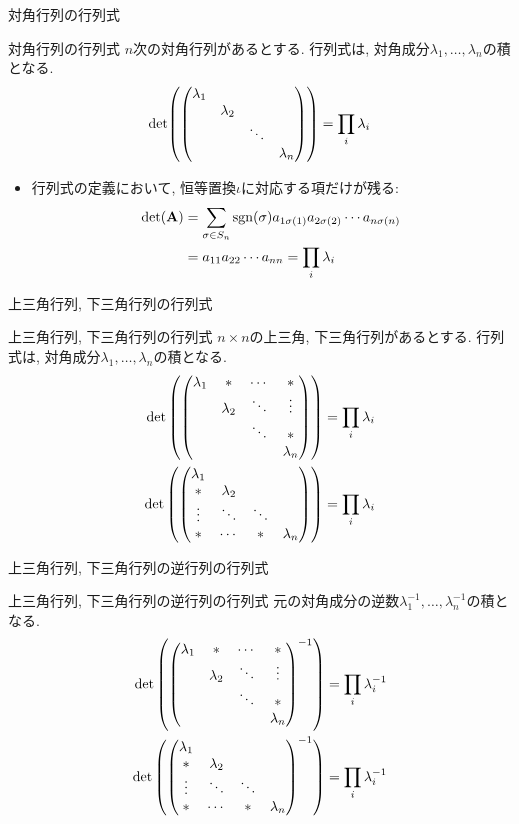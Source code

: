 \documentclass[dvipdfmx,notheorems,t]{beamer}
\begin{document}
\begin{frame}{対角行列の行列式}
\begin{block}{対角行列の行列式}
  $n$次の対角行列があるとする.
  行列式は, 対角成分$\lambda_1, \ldots, \lambda_n$の積となる.
  $$\det(\mqty(\dmat{\lambda_1, \lambda_2, \ddots, \lambda_n})) = \prod_i \lambda_i$$
\end{block}

\begin{itemize}
  \item 行列式の定義において, 恒等置換$\iota$に対応する項だけが残る:
  \begin{align*}
    \det(\vb{A}) &= \sum_{\sigma \in S_n} \operatorname{sgn}(\sigma)
      a_{1 \sigma(1)} a_{2 \sigma(2)} \cdots a_{n \sigma(n)} \\
      &= a_{11} a_{22} \cdots a_{n n}
      = \prod_i \lambda_i
  \end{align*}
\end{itemize}
\end{frame}

\begin{frame}{上三角行列, 下三角行列の行列式}
\begin{block}{上三角行列, 下三角行列の行列式}
  $n \times n$の上三角, 下三角行列があるとする.
  行列式は, 対角成分$\lambda_1, \ldots, \lambda_n$の積となる.
  \begin{align*}
    \det\left( \mqty(\lambda_1 & * & \cdots & * \\
      & \lambda_2 & \ddots & \vdots \\
      & & \ddots & * \\
      & & & \lambda_n) \right) &= \prod_i \lambda_i \\
    \det\left( \mqty(\lambda_1 \\ * & \lambda_2 \\
      \vdots & \ddots & \ddots \\
      * & \cdots & * & \lambda_n) \right) &= \prod_i \lambda_i
  \end{align*}
\end{block}
\end{frame}

\begin{frame}{上三角行列, 下三角行列の逆行列の行列式}
\begin{block}{上三角行列, 下三角行列の逆行列の行列式}
  元の対角成分の逆数$\lambda_1^{-1}, \ldots, \lambda_n^{-1}$の積となる.
  \begin{align*}
    \det\left( \mqty(\lambda_1 & * & \cdots & * \\
      & \lambda_2 & \ddots & \vdots \\
      & & \ddots & * \\
      & & & \lambda_n)^{-1} \right) &= \prod_i \lambda_i^{-1} \\
    \det\left( \mqty(\lambda_1 \\ * & \lambda_2 \\
      \vdots & \ddots & \ddots \\
      * & \cdots & * & \lambda_n)^{-1} \right) &= \prod_i \lambda_i^{-1}
  \end{align*}
\end{block}
\end{frame}
\end{document}
